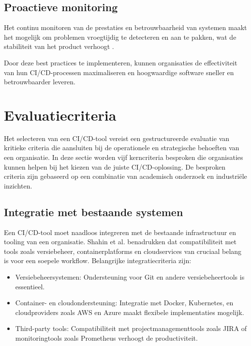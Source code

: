 \subsection{Proactieve monitoring}
Het continu monitoren van de prestaties en betrouwbaarheid van systemen maakt het mogelijk om problemen vroegtijdig te detecteren en aan te pakken, wat de stabiliteit van het product verhoogt \autocite{shahin2017}.

Door deze best practices te implementeren, kunnen organisaties de effectiviteit van hun CI/CD-processen maximaliseren en hoogwaardige software sneller en betrouwbaarder leveren.

\section{Evaluatiecriteria}

Het selecteren van een CI/CD-tool vereist een gestructureerde evaluatie van kritieke criteria die aansluiten bij de operationele en strategische behoeften van een organisatie. In deze sectie worden vijf kerncriteria besproken die organisaties kunnen helpen bij het kiezen van de juiste CI/CD-oplossing. De besproken criteria zijn gebaseerd op een combinatie van academisch onderzoek en industriële inzichten.

\subsection{Integratie met bestaande systemen}
Een CI/CD-tool moet naadloos integreren met de bestaande infrastructuur en tooling van een organisatie. Shahin et al. \autocite{shahin2017} benadrukken dat compatibiliteit met tools zoals versiebeheer, containerplatforms en cloudservices van cruciaal belang is voor een soepele workflow.
Belangrijke integratiecriteria zijn: \begin{itemize} \item Versiebeheersystemen: Ondersteuning voor Git en andere versiebeheertools is essentieel. \autocite{springer2023ci} \item Container- en cloudondersteuning: Integratie met Docker, Kubernetes, en cloudproviders zoals AWS en Azure maakt flexibele implementaties mogelijk. \autocite{ieee2021cicd} \item Third-party tools: Compatibiliteit met projectmanagementtools zoals JIRA of monitoringtools zoals Prometheus verhoogt de productiviteit. \end{itemize}

